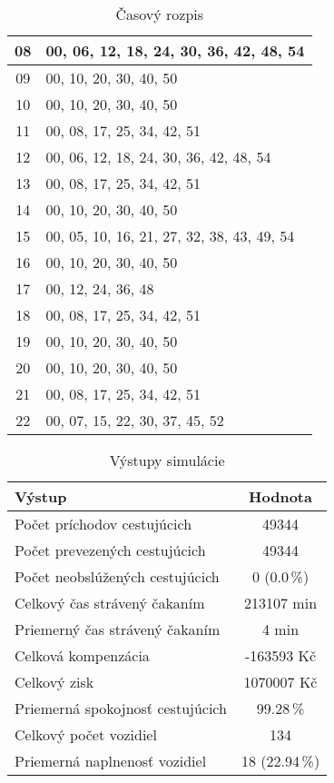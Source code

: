 \begin{table}[h]
\begin{minipage}{0.45\textwidth}
\begin{tabular}{|c|l|}
        08 & 00, 06, 12, 18, 24, 30, 36, 42, 48, 54 \\ \hline
        09 & 00, 10, 20, 30, 40, 50 \\ \hline
        10 & 00, 10, 20, 30, 40, 50 \\ \hline
        11 & 00, 08, 17, 25, 34, 42, 51 \\ \hline
        12 & 00, 06, 12, 18, 24, 30, 36, 42, 48, 54 \\ \hline
        13 & 00, 08, 17, 25, 34, 42, 51 \\ \hline
        14 & 00, 10, 20, 30, 40, 50 \\ \hline
        15 & 00, 05, 10, 16, 21, 27, 32, 38, 43, 49, 54 \\ \hline
        16 & 00, 10, 20, 30, 40, 50 \\ \hline
        17 & 00, 12, 24, 36, 48 \\ \hline
        18 & 00, 08, 17, 25, 34, 42, 51 \\ \hline
        19 & 00, 10, 20, 30, 40, 50 \\ \hline
        20 & 00, 10, 20, 30, 40, 50 \\ \hline
        21 & 00, 08, 17, 25, 34, 42, 51 \\ \hline
        22 & 00, 07, 15, 22, 30, 37, 45, 52 \\ \hline
      \end{tabular}
      \caption{Časový rozpis}
      \end{minipage}
  \end{table}

  \begin{table}[h]
    \centering
    \begin{tabular}{|l|c|}
      \hline
        \textbf{Výstup} & \textbf{Hodnota} \\ \hline
        Počet príchodov cestujúcich & 49344 \\ \hline
        Počet prevezených cestujúcich & 49344 \\ \hline
        Počet neobslúžených cestujúcich & 0 (0.0\,\%) \\ \hline
        Celkový čas strávený čakaním & 213107 min \\ \hline
        Priemerný čas strávený čakaním & 4 min \\ \hline
        Celková kompenzácia & -163593 Kč \\ \hline
        Celkový zisk & 1070007 Kč \\ \hline
        Priemerná spokojnosť cestujúcich & 99.28\,\% \\ \hline
        Celkový počet vozidiel & 134 \\ \hline
        Priemerná naplnenosť vozidiel & 18 (22.94\,\%) \\ \hline
    \end{tabular}
    \caption{Výstupy simulácie}
  \end{table}

